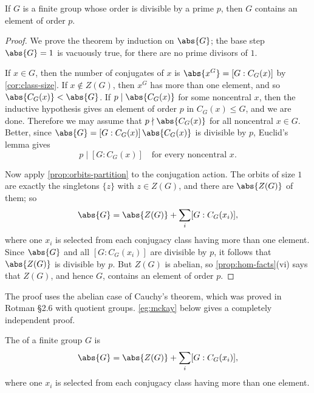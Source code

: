 \begin{theorem}[Cauchy]\label{thm:cauchy}
	If \(G\) is a finite group whose order is divisible by a prime \(p\), then \(G\)
	contains an element of order \(p\).
\end{theorem}

\begin{proof}
	We prove the theorem by induction on \(\abs{G}\); the base step \(\abs{G} = 1\) is
	vacuously true, for there are no prime divisors of \(1\).

	If \(x \in G\), then the number of conjugates of \(x\) is
	\(\abs{x^G} = [G : C_G(x)]\) by \autoref{cor:class-size}. If \(x \notin Z(G)\), then
	\(x^G\) has more than one element, and so \(\abs{C_G(x)} < \abs{G}\). If
	\(p \mid \abs{C_G(x)}\) for some noncentral \(x\), then the inductive hypothesis gives
	an element of order \(p\) in \(C_G(x) \leq G\), and we are done. Therefore we may
	assume that \(p \nmid \abs{C_G(x)}\) for all noncentral \(x \in G\). Better, since
	\(\abs{G} = [G : C_G(x)]\,\abs{C_G(x)}\) is divisible by \(p\), Euclid's lemma gives
	\[
		p \mid [G : C_G(x)] \quad\text{for every noncentral } x.
	\]

	Now apply \autoref{prop:orbits-partition} to the conjugation action. The orbits of
	size \(1\) are exactly the singletons \(\{z\}\) with \(z \in Z(G)\), and there are
	\(\abs{Z(G)}\) of them; so
	\[
		\abs{G} = \abs{Z(G)} + \sum_i [G : C_G(x_i)],
	\]
	where one \(x_i\) is selected from each conjugacy class having more than one element.
	Since \(\abs{G}\) and all \([G : C_G(x_i)]\) are divisible by \(p\), it follows that
	\(\abs{Z(G)}\) is divisible by \(p\). But \(Z(G)\) is abelian, so
	\autoref{prop:hom-facts}(vi) says that \(Z(G)\), and hence \(G\), contains an element
	of order \(p\).
\end{proof}

\begin{remark}
	The proof uses the abelian case of Cauchy's theorem, which was proved in Rotman §2.6
	with quotient groups. \autoref{eg:mckay} below gives a completely independent proof.
\end{remark}

\begin{definition}\label{def:class-equation}
	The  of a finite group \(G\) is
	\[
		\abs{G} = \abs{Z(G)} + \sum_i [G : C_G(x_i)],
	\]
	where one \(x_i\) is selected from each conjugacy class having more than one element.
\end{definition}

